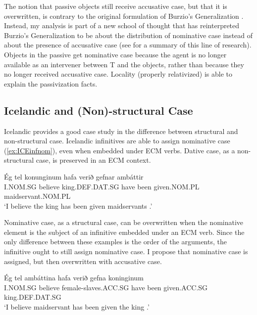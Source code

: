 The notion that passive objects still receive accusative case, but that it is overwritten, is contrary to the original formulation of Burzio's Generalization \citep{Burzio.1986}. Instead, my analysis is part of a new school of thought that has reinterpreted Burzio's Generalization to be about the distribution of nominative case instead of about the presence of accusative case (see \citep{Woolford.2003b} for a summary of this line of research). Objects in the passive get nominative case because the agent is no longer available as an intervener between T and the objects, rather than because they no longer received accusative case. Locality (properly relativized) is able to explain the passivization facts.

\subsection{Icelandic and (Non)-structural Case}
Icelandic provides a good case study in the difference between structural and non-structural case. Icelandic infinitives are able to assign nominative case (\ref{ex:ICEinfnom}), even when embedded under ECM verbs. Dative case, as a non-structural case, is preserved in an ECM context.

\begin{exe}
\ex\label{ex:ICEinfnom} \gll Ég tel konunginum hafa verið gefnar ambáttir\\
I.NOM.SG believe king.DEF.DAT.SG have been given.NOM.PL maidservant.NOM.PL\\
\trans `I believe the king has been given maidservants \citep[ex 45a]{Zaenen.1985}.'
\end{exe}

Nominative case, as a structural case, can be overwritten when the nominative element is the subject of an infinitive embedded under an ECM verb. Since the only difference between these examples is the order of the arguments, the infinitive ought to still assign nominative case. I propose that nominative case is assigned, but then overwritten with accusative case.

\begin{exe}
\ex\label{ex:ICEECM} \gll Ég tel ambáttina hafa verið gefna koninginum\\
I.NOM.SG believe female-slaves.ACC.SG have been given.ACC.SG king.DEF.DAT.SG\\
\trans `I believe maidservant has been given the king \citep[ex 45b]{Zaenen.1985}.'
\end{exe}

